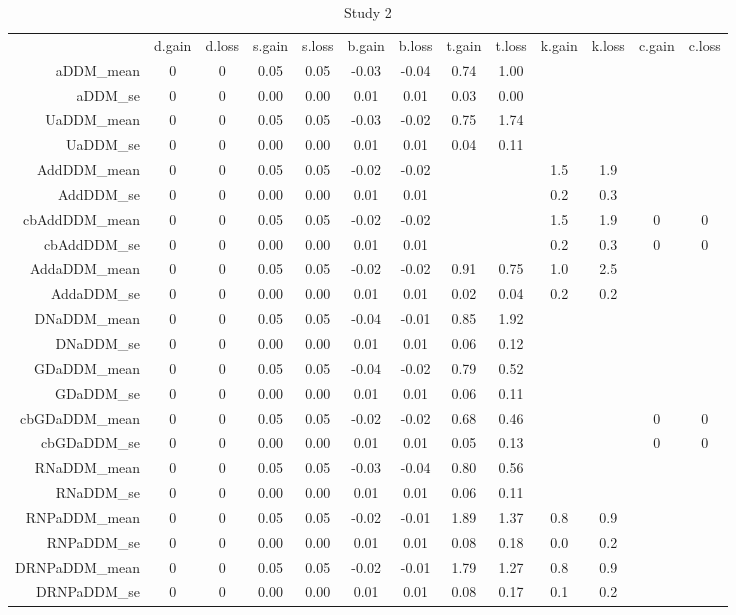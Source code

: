 \begin{table}[ht]
\centering
\begin{tabular}{|r|cc|cc|cc|cc|cc|cc|}
  & d.gain & d.loss & s.gain & s.loss & b.gain & b.loss & t.gain & t.loss & k.gain & k.loss & c.gain & c.loss \\ 
 aDDM\_mean & 0 & 0 & 0.05 & 0.05 & -0.03 & -0.04 & 0.74 & 1.00 &  &  &  &  \\ 
  aDDM\_se & 0 & 0 & 0.00 & 0.00 & 0.01 & 0.01 & 0.03 & 0.00 &  &  &  &  \\ 
   \hline
UaDDM\_mean & 0 & 0 & 0.05 & 0.05 & -0.03 & -0.02 & 0.75 & 1.74 &  &  &  &  \\ 
  UaDDM\_se & 0 & 0 & 0.00 & 0.00 & 0.01 & 0.01 & 0.04 & 0.11 &  &  &  &  \\ 
   \hline
AddDDM\_mean & 0 & 0 & 0.05 & 0.05 & -0.02 & -0.02 &  &  & 1.5 & 1.9 &  &  \\ 
  AddDDM\_se & 0 & 0 & 0.00 & 0.00 & 0.01 & 0.01 &  &  & 0.2 & 0.3 &  &  \\ 
   \hline
cbAddDDM\_mean & 0 & 0 & 0.05 & 0.05 & -0.02 & -0.02 &  &  & 1.5 & 1.9 & 0 & 0 \\ 
  cbAddDDM\_se & 0 & 0 & 0.00 & 0.00 & 0.01 & 0.01 &  &  & 0.2 & 0.3 & 0 & 0 \\ 
   \hline
AddaDDM\_mean & 0 & 0 & 0.05 & 0.05 & -0.02 & -0.02 & 0.91 & 0.75 & 1.0 & 2.5 &  &  \\ 
  AddaDDM\_se & 0 & 0 & 0.00 & 0.00 & 0.01 & 0.01 & 0.02 & 0.04 & 0.2 & 0.2 &  &  \\ 
   \hline
DNaDDM\_mean & 0 & 0 & 0.05 & 0.05 & -0.04 & -0.01 & 0.85 & 1.92 &  &  &  &  \\ 
  DNaDDM\_se & 0 & 0 & 0.00 & 0.00 & 0.01 & 0.01 & 0.06 & 0.12 &  &  &  &  \\ 
   \hline
GDaDDM\_mean & 0 & 0 & 0.05 & 0.05 & -0.04 & -0.02 & 0.79 & 0.52 &  &  &  &  \\ 
  GDaDDM\_se & 0 & 0 & 0.00 & 0.00 & 0.01 & 0.01 & 0.06 & 0.11 &  &  &  &  \\ 
   \hline
cbGDaDDM\_mean & 0 & 0 & 0.05 & 0.05 & -0.02 & -0.02 & 0.68 & 0.46 &  &  & 0 & 0 \\ 
  cbGDaDDM\_se & 0 & 0 & 0.00 & 0.00 & 0.01 & 0.01 & 0.05 & 0.13 &  &  & 0 & 0 \\ 
   \hline
RNaDDM\_mean & 0 & 0 & 0.05 & 0.05 & -0.03 & -0.04 & 0.80 & 0.56 &  &  &  &  \\ 
  RNaDDM\_se & 0 & 0 & 0.00 & 0.00 & 0.01 & 0.01 & 0.06 & 0.11 &  &  &  &  \\ 
   \hline
RNPaDDM\_mean & 0 & 0 & 0.05 & 0.05 & -0.02 & -0.01 & 1.89 & 1.37 & 0.8 & 0.9 &  &  \\ 
  RNPaDDM\_se & 0 & 0 & 0.00 & 0.00 & 0.01 & 0.01 & 0.08 & 0.18 & 0.0 & 0.2 &  &  \\ 
   \hline
DRNPaDDM\_mean & 0 & 0 & 0.05 & 0.05 & -0.02 & -0.01 & 1.79 & 1.27 & 0.8 & 0.9 &  &  \\ 
  DRNPaDDM\_se & 0 & 0 & 0.00 & 0.00 & 0.01 & 0.01 & 0.08 & 0.17 & 0.1 & 0.2 &  &  \\ 
   \hline
\end{tabular}
\caption{Study 2} 
\end{table}
